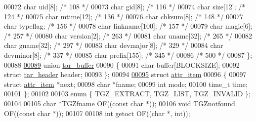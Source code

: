 \begin{DoxyCode}
00072   \textcolor{keywordtype}{char} uid[8];                  \textcolor{comment}{/* 108 */}
00073   \textcolor{keywordtype}{char} gid[8];                  \textcolor{comment}{/* 116 */}
00074   \textcolor{keywordtype}{char} size[12];                \textcolor{comment}{/* 124 */}
00075   \textcolor{keywordtype}{char} mtime[12];               \textcolor{comment}{/* 136 */}
00076   \textcolor{keywordtype}{char} chksum[8];               \textcolor{comment}{/* 148 */}
00077   \textcolor{keywordtype}{char} typeflag;                \textcolor{comment}{/* 156 */}
00078   \textcolor{keywordtype}{char} linkname[100];           \textcolor{comment}{/* 157 */}
00079   \textcolor{keywordtype}{char} magic[6];                \textcolor{comment}{/* 257 */}
00080   \textcolor{keywordtype}{char} version[2];              \textcolor{comment}{/* 263 */}
00081   \textcolor{keywordtype}{char} uname[32];               \textcolor{comment}{/* 265 */}
00082   \textcolor{keywordtype}{char} gname[32];               \textcolor{comment}{/* 297 */}
00083   \textcolor{keywordtype}{char} devmajor[8];             \textcolor{comment}{/* 329 */}
00084   \textcolor{keywordtype}{char} devminor[8];             \textcolor{comment}{/* 337 */}
00085   \textcolor{keywordtype}{char} prefix[155];             \textcolor{comment}{/* 345 */}
00086                                 \textcolor{comment}{/* 500 */}
00087 \};
00088 
\hyperlink{uniontar__buffer}{00089} \textcolor{keyword}{union }\hyperlink{uniontar__buffer}{tar\_buffer}
00090 \{
00091   \textcolor{keywordtype}{char}               buffer[BLOCKSIZE];
00092   \textcolor{keyword}{struct }\hyperlink{structtar__header}{tar\_header}  header;
00093 \};
00094 
\hyperlink{structattr__item}{00095} \textcolor{keyword}{struct }\hyperlink{structattr__item}{attr\_item}
00096 \{
00097   \textcolor{keyword}{struct }\hyperlink{structattr__item}{attr\_item}  *next;
00098   \textcolor{keywordtype}{char}              *fname;
00099   \textcolor{keywordtype}{int}                mode;
00100   time\_t             time;
00101 \};
00102 
00103 \textcolor{keyword}{enum} \{ TGZ\_EXTRACT, TGZ\_LIST, TGZ\_INVALID \};
00104 
00105 \textcolor{keywordtype}{char} *TGZfname          OF((\textcolor{keyword}{const} \textcolor{keywordtype}{char} *));
00106 \textcolor{keywordtype}{void} TGZnotfound        OF((\textcolor{keyword}{const} \textcolor{keywordtype}{char} *));
00107 
00108 \textcolor{keywordtype}{int} getoct              OF((\textcolor{keywordtype}{char} *, \textcolor{keywordtype}{int}));

\end{DoxyCode}
